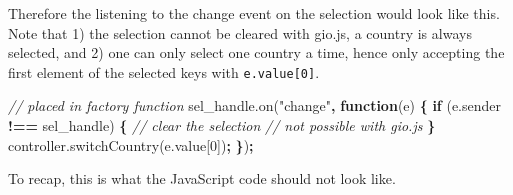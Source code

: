 \documentclass[
]{krantz}
\makeatletter
\newenvironment{Shaded}{\begin{snugshade}}{\end{snugshade}}
\newcommand{\AttributeTok}[1]{\textcolor[rgb]{0.61,0.61,0.61}{#1}}
\newcommand{\CommentTok}[1]{\textcolor[rgb]{0.37,0.37,0.37}{\textit{#1}}}
\newcommand{\ControlFlowTok}[1]{\textcolor[rgb]{0.27,0.27,0.27}{\textbf{#1}}}
\newcommand{\DecValTok}[1]{\textcolor[rgb]{0.06,0.06,0.06}{#1}}
\newcommand{\KeywordTok}[1]{\textcolor[rgb]{0.27,0.27,0.27}{\textbf{#1}}}
\newcommand{\NormalTok}[1]{#1}
\newcommand{\OperatorTok}[1]{\textcolor[rgb]{0.43,0.43,0.43}{\textbf{#1}}}
\newcommand{\StringTok}[1]{\textcolor[rgb]{0.5,0.5,0.5}{#1}}
\newcommand{\VariableTok}[1]{\textcolor[rgb]{0,0,0}{#1}}
\newenvironment{kframe}{%
\medskip{}
\setlength{\fboxsep}{.8em}
 \def\at@end@of@kframe{}%
 \ifinner\ifhmode%
  \def\at@end@of@kframe{\end{minipage}}%
  \begin{minipage}{\columnwidth}%
 \fi\fi%
 \def\FrameCommand##1{\hskip\@totalleftmargin \hskip-\fboxsep
 \colorbox{shadecolor}{##1}\hskip-\fboxsep
     \hskip-\linewidth \hskip-\@totalleftmargin \hskip\columnwidth}%
 \MakeFramed {\advance\hsize-\width
   \@totalleftmargin\z@ \linewidth\hsize
   \@setminipage}}%
 {\par\unskip\endMakeFramed%
 \at@end@of@kframe}
\renewenvironment{Shaded}{\begin{kframe}}{\end{kframe}}
\makeatother
\begin{document}
Therefore the listening to the change event on the selection would look like this. Note that 1) the selection cannot be cleared with gio.js, a country is always selected, and 2) one can only select one country a time, hence only accepting the first element of the selected keys with \texttt{e.value{[}0{]}}.

\begin{Shaded}
\begin{Highlighting}[]
\CommentTok{// placed in factory function}
\VariableTok{sel\_handle}\NormalTok{.}\AttributeTok{on}\NormalTok{(}\StringTok{"change"}\OperatorTok{,} \KeywordTok{function}\NormalTok{(e) }\OperatorTok{\{}
  \ControlFlowTok{if}\NormalTok{ (}\VariableTok{e}\NormalTok{.}\AttributeTok{sender} \OperatorTok{!==}\NormalTok{ sel\_handle) }\OperatorTok{\{}
    \CommentTok{// clear the selection}
    \CommentTok{// not possible with gio.js}
  \OperatorTok{\}}
  \VariableTok{controller}\NormalTok{.}\AttributeTok{switchCountry}\NormalTok{(}\VariableTok{e}\NormalTok{.}\AttributeTok{value}\NormalTok{[}\DecValTok{0}\NormalTok{])}\OperatorTok{;}
\OperatorTok{\}}\NormalTok{)}\OperatorTok{;}
\end{Highlighting}
\end{Shaded}

To recap, this is what the JavaScript code should not look like.
\end{document}
